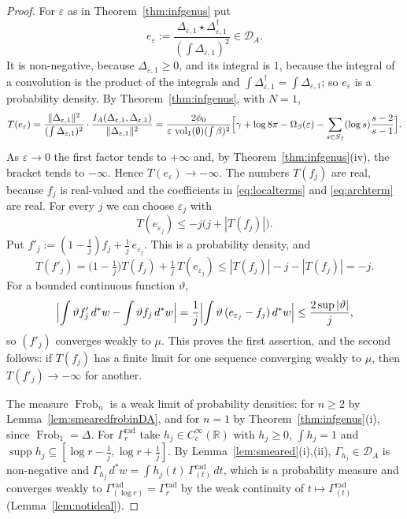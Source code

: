 \documentclass[11pt]{amsart}
\theoremstyle{definition}
\newcommand{\R}{\mathbb R}
\newcommand{\Frob}{\operatorname{Frob}}
\newcommand{\supp}{\operatorname{supp}}
\newcommand{\vol}{\operatorname{vol}}
\newcommand{\DA}{\mathcal D_A}
\begin{document}
\begin{proof}
For $\varepsilon$ as in Theorem~\ref{thm:infgenus} put
\[
  e_\varepsilon:=\frac{\Delta_{\varepsilon,1}\star\Delta_{\varepsilon,1}^\dagger}
   {(\int\Delta_{\varepsilon,1})^2}\in\DA .
\]
It is non-negative, because $\Delta_{\varepsilon,1}\ge0$, and its integral is
$1$, because the integral of a convolution is the product of the integrals
and $\int\Delta_{\varepsilon,1}^\dagger=\int\Delta_{\varepsilon,1}$; so
$e_\varepsilon$ is a probability density. By Theorem~\ref{thm:infgenus}, with
$N=1$,
\[
  T(e_\varepsilon)
   =\frac{\|\Delta_{\varepsilon,1}\|^2}{(\int\Delta_{\varepsilon,1})^2}\cdot
    \frac{I_A(\Delta_{\varepsilon,1},\Delta_{\varepsilon,1})}
         {\|\Delta_{\varepsilon,1}\|^2}
   =\frac{2\phi_0}{\varepsilon\,\vol_1(\emptyset)(\int\beta)^2}
    \Bigl[\gamma+\log8\pi-\Omega_\beta(\varepsilon)
     -\sum_{s\in S_f}(\log s)\frac{s-2}{s-1}\Bigr].
\]
As $\varepsilon\to0$ the first factor tends to $+\infty$ and, by
Theorem~\ref{thm:infgenus}(iv), the bracket tends to $-\infty$. Hence
$T(e_\varepsilon)\to-\infty$. The numbers $T(f_j)$ are real, because $f_j$
is real-valued and the coefficients in \eqref{eq:localterms} and
\eqref{eq:archterm} are real. For every $j$ we can choose
$\varepsilon_j$ with
\[
  T(e_{\varepsilon_j})\le-j\bigl(j+|T(f_j)|\bigr).
\]
Put $f'_j:=(1-\tfrac1j)f_j+\tfrac1j\,e_{\varepsilon_j}$. This is a
probability density, and
\[
  T(f'_j)=\bigl(1-\tfrac1j\bigr)T(f_j)+\tfrac1j\,T(e_{\varepsilon_j})
   \le|T(f_j)|-j-|T(f_j)|=-j .
\]
For a bounded continuous function $\vartheta$,
\[
  \Bigl|\int\vartheta f'_j\,d^*w-\int\vartheta f_j\,d^*w\Bigr|
   =\frac1j\Bigl|\int\vartheta\,(e_{\varepsilon_j}-f_j)\,d^*w\Bigr|
   \le\frac{2\sup|\vartheta|}{j},
\]
so $(f'_j)$ converges weakly to $\mu$. This proves the first assertion, and
the second follows: if $T(f_j)$ has a finite limit for one sequence
converging weakly to $\mu$, then $T(f'_j)\to-\infty$ for another.

The measure $\Frob_n$ is a weak limit of probability densities: for $n\ge2$
by Lemma~\ref{lem:smearedfrobinDA}, and for $n=1$ by
Theorem~\ref{thm:infgenus}(i), since $\Frob_1=\Delta$. For
$\Gamma_r^{\mathrm{rad}}$ take $h_j\in C_c^\infty(\R)$ with $h_j\ge0$,
$\int h_j=1$ and $\supp h_j\subseteq[\log r-\tfrac1j,\log r+\tfrac1j]$. By
Lemma~\ref{lem:smeared}(i),(ii), $\Gamma_{h_j}\in\DA$ is non-negative and
$\Gamma_{h_j}\,d^*w=\int h_j(t)\,\Gamma^{\mathrm{rad}}_{(t)}\,dt$, which is a
probability measure and converges weakly to
$\Gamma^{\mathrm{rad}}_{(\log r)}=\Gamma_r^{\mathrm{rad}}$ by the weak
continuity of $t\mapsto\Gamma^{\mathrm{rad}}_{(t)}$
(Lemma~\ref{lem:notideal}).
\end{proof}
\end{document}
